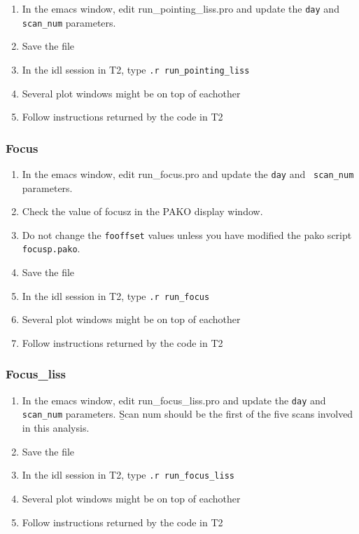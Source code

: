 \documentclass[a4paper,10pt]{article}
\begin{document}
\begin{enumerate}
\item In the emacs window, edit run\_pointing\_liss.pro and update the {\tt day}
  and {\tt scan\_num} parameters.
\item Save the file
\item In the idl session in T2, type {\tt .r run\_pointing\_liss}
\item Several plot windows might be on top of eachother
\item Follow instructions returned by the code in T2
\end{enumerate}

\subsubsection{Focus}

\begin{enumerate}
\item In the emacs window, edit run\_focus.pro and update the {\tt day} and {\tt
  scan\_num} parameters.
\item Check the value of focusz in the PAKO display window.
\item Do not change the {\tt fooffset} values unless you have modified the pako
  script {\tt focusp.pako}.
\item Save the file
\item In the idl session in T2, type {\tt .r run\_focus}
\item Several plot windows might be on top of eachother
\item Follow instructions returned by the code in T2
\end{enumerate}

\subsubsection{Focus\_liss}

\begin{enumerate}
\item In the emacs window, edit run\_focus\_liss.pro and update the {\tt day}
  and {\tt scan\_num} parameters. {\b Scan num should be the first of the five
    scans involved in this analysis}.
\item Save the file
\item In the idl session in T2, type {\tt .r run\_focus\_liss}
\item Several plot windows might be on top of eachother
\item Follow instructions returned by the code in T2
\end{enumerate}
\end{document}
